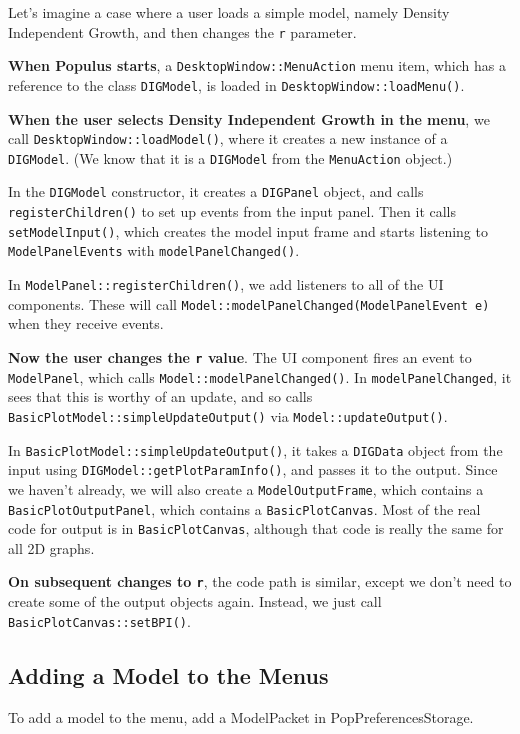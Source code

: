\documentclass[12pt]{article}
\begin{document}
Let's imagine a case where a user loads a simple model, namely Density Independent Growth, and then changes the \texttt{r} parameter.

\textbf{When Populus starts}, a \texttt{DesktopWindow::MenuAction} menu item, which has a reference to the class \texttt{DIGModel}, is loaded in \texttt{DesktopWindow::loadMenu()}.

\textbf{When the user selects Density Independent Growth in the menu}, we call \texttt{DesktopWindow::loadModel()}, where it creates a new instance of a \texttt{DIGModel}.  (We know that it is a \texttt{DIGModel} from the \texttt{MenuAction} object.)

In the \texttt{DIGModel} constructor, it creates a \texttt{DIGPanel} object, and calls \texttt{registerChildren()} to set up events from the input panel.  Then it calls \texttt{setModelInput()}, which creates the model input frame and starts listening to \texttt{ModelPanelEvents} with \texttt{modelPanelChanged()}.

In \texttt{ModelPanel::registerChildren()}, we add listeners to all of the UI components.  These will call \texttt{Model::modelPanelChanged(ModelPanelEvent e)} when they receive events.

\textbf{Now the user changes the \texttt{r} value}.  The UI component fires an event to \texttt{ModelPanel}, which calls \texttt{Model::modelPanelChanged()}. In \texttt{modelPanelChanged}, it sees that this is worthy of an update, and so calls \texttt{BasicPlotModel::simpleUpdateOutput()} via \texttt{Model::updateOutput()}.

In \texttt{BasicPlotModel::simpleUpdateOutput()}, it takes a \texttt{DIGData} object from the input using \texttt{DIGModel::getPlotParamInfo()}, and passes it to the output.  Since we haven't already, we will also create a \texttt{ModelOutputFrame}, which contains a \texttt{BasicPlotOutputPanel}, which contains a \texttt{BasicPlotCanvas}.  Most of the real code for output is in \texttt{BasicPlotCanvas}, although that code is really the same for all 2D graphs.

\textbf{On subsequent changes to \texttt{r}}, the code path is similar, except we don't need to create some of the output objects again.  Instead, we just call \texttt{BasicPlotCanvas::setBPI()}.


\subsection{Adding a Model to the Menus}
To add a model to the menu, add a ModelPacket in PopPreferencesStorage.
\end{document}
